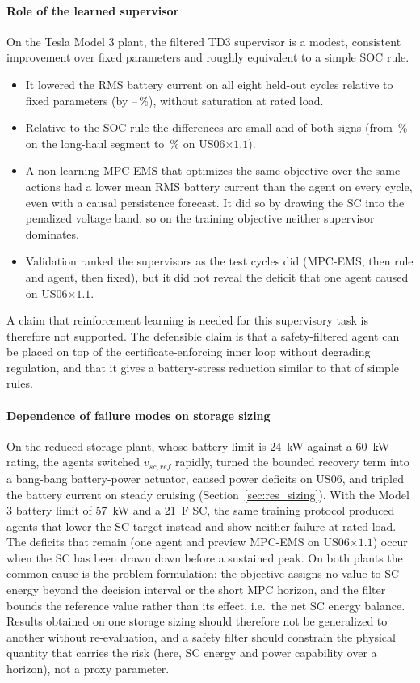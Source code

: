 \paragraph{Role of the learned supervisor}
On the Tesla Model 3 plant, the filtered TD3 supervisor is a modest, consistent improvement over fixed parameters and roughly equivalent to a simple SOC rule.
\begin{itemize}
\item It lowered the RMS battery current on all eight held-out cycles relative to fixed parameters (by --\,\%), without saturation at rated load.
\item Relative to the SOC rule the differences are small and of both signs (from \,\% on the long-haul segment to \,\% on US06$\times1.1$).
\item A non-learning MPC-EMS that optimizes the same objective over the same actions had a lower mean RMS battery current than the agent on every cycle, even with a causal persistence forecast. It did so by drawing the SC into the penalized voltage band, so on the training objective neither supervisor dominates.
\item Validation ranked the supervisors as the test cycles did (MPC-EMS, then rule and agent, then fixed), but it did not reveal the deficit that one agent caused on US06$\times1.1$.
\end{itemize}
A claim that reinforcement learning is needed for this supervisory task is therefore not supported. The defensible claim is that a safety-filtered agent can be placed on top of the certificate-enforcing inner loop without degrading regulation, and that it gives a battery-stress reduction similar to that of simple rules.

\paragraph{Dependence of failure modes on storage sizing}
On the reduced-storage plant, whose battery limit is \SI{24}{kW} against a \SI{60}{kW} rating, the agents switched $v_{sc,ref}$ rapidly, turned the bounded recovery term into a bang-bang battery-power actuator, caused power deficits on US06, and tripled the battery current on steady cruising (Section~\ref{sec:res_sizing}). With the Model 3 battery limit of \SI{57}{kW} and a \SI{21}{F} SC, the same training protocol produced agents that lower the SC target instead and show neither failure at rated load. The deficits that remain (one agent and preview MPC-EMS on US06$\times1.1$) occur when the SC has been drawn down before a sustained peak. On both plants the common cause is the problem formulation: the objective assigns no value to SC energy beyond the decision interval or the short MPC horizon, and the filter bounds the reference value rather than its effect, i.e.\ the net SC energy balance. Results obtained on one storage sizing should therefore not be generalized to another without re-evaluation, and a safety filter should constrain the physical quantity that carries the risk (here, SC energy and power capability over a horizon), not a proxy parameter.

